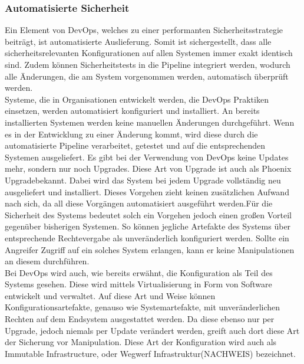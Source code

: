 \subsubsection{Automatisierte Sicherheit}
Ein Element von DevOps, welches zu einer performanten Sicherheitsstrategie beiträgt, ist automatisierte Auslieferung. Somit ist sichergestellt, dass alle sicherheitsrelevanten Konfigurationen auf allen Systemen immer exakt identisch sind. Zudem können Sicherheitstests in die Pipeline integriert werden, wodurch alle Änderungen, die am System vorgenommen werden, automatisch überprüft werden.\\
Systeme, die in Organisationen entwickelt werden, die DevOps Praktiken einsetzen, werden automatisiert konfiguriert und installiert. An bereits installierten Systemen werden keine manuellen Änderungen durchgeführt. Wenn es in der Entwicklung zu einer Änderung kommt, wird diese durch die automatisierte Pipeline verarbeitet, getestet und auf die entsprechenden Systemen ausgeliefert. Es gibt bei der Verwendung von DevOps keine Updates mehr, sondern nur noch Upgrades. Diese Art von Upgrade ist auch als \glqq Phoenix Upgrade\grqq bekannt. Dabei wird das System bei jedem Upgrade vollständig neu ausgeliefert und installiert. Dieses Vorgehen zieht keinen zusätzlichen Aufwand nach sich, da all diese Vorgängen automatisiert ausgeführt werden.Für die Sicherheit des Systems bedeutet solch ein Vorgehen jedoch einen großen Vorteil gegenüber bisherigen Systemen. So können jegliche Artefakte des Systems über entsprechende Rechtevergabe als unveränderlich konfiguriert werden. Sollte ein Angreifer Zugriff auf ein solches System erlangen, kann er keine Manipulationen an diesem durchführen.\\
Bei DevOps wird auch, wie bereits erwähnt, die Konfiguration als Teil des Systems gesehen. Diese wird mittels Virtualisierung in Form von Software entwickelt und verwaltet. Auf diese Art und Weise können Konfigurationsartefakte, genauso wie Systemartefakte, mit unveränderlichen Rechten auf dem Endsystem ausgestattet werden. Da diese ebenso nur per Upgrade, jedoch niemals per Update verändert werden, greift auch dort diese Art der Sicherung vor Manipulation. Diese Art der Konfiguration wird auch als \glqq Immutable Infrastructure\grqq, oder \glqq Wegwerf Infrastruktur\grqq (NACHWEIS) bezeichnet.\\
